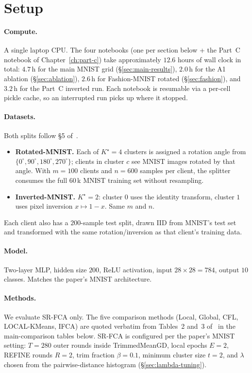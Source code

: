 \section{Setup}\label{sec:setup}

\paragraph{Compute.} A single laptop CPU. The four notebooks (one per section below + the Part~C notebook of Chapter~\ref{ch:part-c}) take approximately $12.6$ hours of wall clock in total: $4.7$\,h for the main MNIST grid (\S\ref{sec:main-results}), $2.0$\,h for the A1 ablation (\S\ref{sec:ablation}), $2.6$\,h for Fashion-MNIST rotated (\S\ref{sec:fashion}), and $3.2$\,h for the Part~C inverted run. Each notebook is resumable via a per-cell pickle cache, so an interrupted run picks up where it stopped.

\paragraph{Datasets.} Both splits follow \S 5 of~\parencite{vardhan2024srfca}.
\begin{itemize}
    \item \textbf{Rotated-MNIST.} Each of $K^\star = 4$ clusters is assigned a rotation angle from $\{0^\circ, 90^\circ, 180^\circ, 270^\circ\}$; clients in cluster $c$ see MNIST images rotated by that angle. With $m = 100$ clients and $n = 600$ samples per client, the splitter consumes the full 60\,k MNIST training set without resampling.
    \item \textbf{Inverted-MNIST.} $K^\star = 2$: cluster $0$ uses the identity transform, cluster $1$ uses pixel inversion $x \mapsto 1 - x$. Same $m$ and $n$.
\end{itemize}
Each client also has a $200$-sample test split, drawn IID from MNIST's test set and transformed with the same rotation/inversion as that client's training data.

\paragraph{Model.} Two-layer MLP, hidden size $200$, ReLU activation, input $28 \times 28 = 784$, output $10$ classes. Matches the paper's MNIST architecture.

\paragraph{Methods.} We evaluate SR-FCA only. The five comparison methods (Local, Global, CFL, LOCAL-KMeans, IFCA) are quoted verbatim from Tables~2 and~3 of~\parencite{vardhan2024srfca} in the main-comparison tables below. SR-FCA is configured per the paper's MNIST setting: $T = 280$ outer rounds inside TrimmedMeanGD, local epochs $E = 2$, REFINE rounds $R = 2$, trim fraction $\beta = 0.1$, minimum cluster size $t = 2$, and $\lambda$ chosen from the pairwise-distance histogram (\S\ref{sec:lambda-tuning}).

